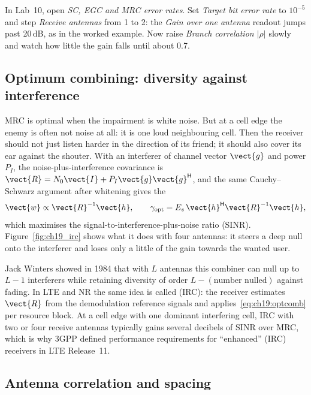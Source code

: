 \begin{tryit}
In Lab~10, open \emph{SC, EGC and MRC error rates}. Set \emph{Target bit error rate} to
$10^{-5}$ and step \emph{Receive antennas} from 1 to 2: the \emph{Gain over one antenna} readout
jumps past 20\,dB, as in the worked example. Now raise \emph{Branch correlation $|\rho|$} slowly
and watch how little the gain falls until about 0.7.
\end{tryit}

\subsection{Optimum combining: diversity against interference}

MRC is optimal when the impairment is white noise. But at a cell edge the enemy is often not
noise at all: it is one loud neighbouring cell. Then the receiver should not just listen harder in
the direction of its friend; it should also cover its ear against the shouter. With an interferer
of channel vector $\vect{g}$ and power $P_I$, the noise-plus-interference covariance is
$\vect{R}=N_0\vect{I}+P_I\vect{g}\vect{g}^{\mathsf H}$, and the same Cauchy--Schwarz argument after
whitening gives the 
\begin{equation}
\vect{w}\propto\vect{R}^{-1}\vect{h},
\qquad
\gamma_{\text{opt}}=E_s\,\vect{h}^{\mathsf H}\vect{R}^{-1}\vect{h},
\label{eq:ch19:optcomb}
\end{equation}
which maximises the signal-to-interference-plus-noise ratio (SINR). Figure~\ref{fig:ch19_irc} shows
what it does with four antennas: it steers a deep null onto the interferer and loses only a little
of the gain towards the wanted user.

Jack Winters showed in 1984 that with $L$ antennas this combiner can null up to $L-1$ interferers
while retaining diversity of order $L-(\text{number nulled})$ against fading. In LTE and NR the
same idea is called  (IRC): the receiver estimates
$\vect{R}$ from the demodulation reference signals and applies~\eqref{eq:ch19:optcomb} per resource
block. At a cell edge with one dominant interfering cell, IRC with two or four receive antennas
typically gains several decibels of SINR over MRC, which is why 3GPP defined performance
requirements for ``enhanced'' (IRC) receivers in LTE Release~11.

\subsection{Antenna correlation and spacing}

